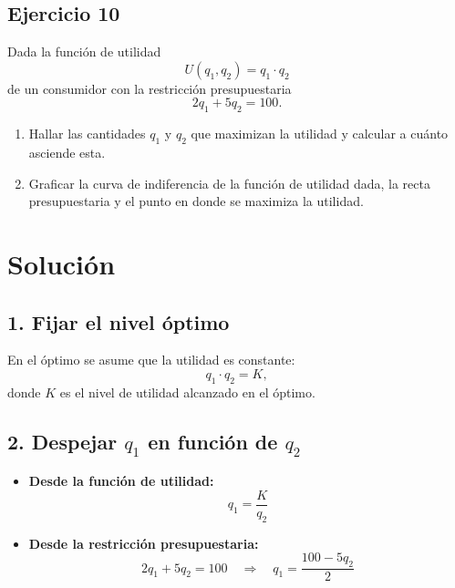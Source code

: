 \documentclass{article}
\begin{document}

\newpage

\subsection{Ejercicio 10}



Dada la función de utilidad 
\[
U(q_1, q_2) = q_1 \cdot q_2
\]
de un consumidor con la restricción presupuestaria
\[
2q_1 + 5q_2 = 100.
\]

\begin{enumerate}
    \item Hallar las cantidades \(q_1\) y \(q_2\) que maximizan la utilidad y calcular a cuánto asciende esta.
    \item Graficar la curva de indiferencia de la función de utilidad dada, la recta presupuestaria y el punto en donde se maximiza la utilidad.
\end{enumerate}
\newpage
\section*{Solución}

\subsection*{1. Fijar el nivel óptimo}
En el óptimo se asume que la utilidad es constante:
\[
q_1 \cdot q_2 = K,
\]
donde \(K\) es el nivel de utilidad alcanzado en el óptimo.

\subsection*{2. Despejar \(q_1\) en función de \(q_2\)}
\begin{itemize}
    \item \textbf{Desde la función de utilidad:}  
    \[
    q_1 = \frac{K}{q_2}
    \]
    \item \textbf{Desde la restricción presupuestaria:}  
    \[
    2q_1 + 5q_2 = 100 \quad \Longrightarrow \quad q_1 = \frac{100 - 5q_2}{2}
    \]
\end{itemize}
\end{document}
